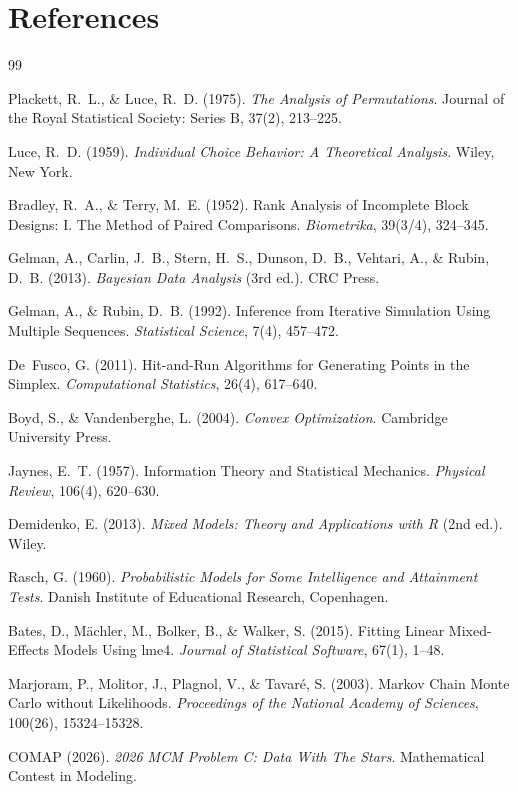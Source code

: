 \documentclass{article}
\begin{document}
\section*{References}
\begin{thebibliography}{99}

Plackett, R.~L., \& Luce, R.~D. (1975).
\emph{The Analysis of Permutations}.
Journal of the Royal Statistical Society: Series B, 37(2), 213--225.

Luce, R.~D. (1959).
\emph{Individual Choice Behavior: A Theoretical Analysis}.
Wiley, New York.

Bradley, R.~A., \& Terry, M.~E. (1952).
Rank Analysis of Incomplete Block Designs: I. The Method of Paired Comparisons.
\emph{Biometrika}, 39(3/4), 324--345.

Gelman, A., Carlin, J.~B., Stern, H.~S., Dunson, D.~B., Vehtari, A., \& Rubin, D.~B. (2013).
\emph{Bayesian Data Analysis} (3rd ed.).
CRC Press.

Gelman, A., \& Rubin, D.~B. (1992).
Inference from Iterative Simulation Using Multiple Sequences.
\emph{Statistical Science}, 7(4), 457--472.

De~Fusco, G. (2011).
Hit-and-Run Algorithms for Generating Points in the Simplex.
\emph{Computational Statistics}, 26(4), 617--640.

Boyd, S., \& Vandenberghe, L. (2004).
\emph{Convex Optimization}.
Cambridge University Press.

Jaynes, E.~T. (1957).
Information Theory and Statistical Mechanics.
\emph{Physical Review}, 106(4), 620--630.

Demidenko, E. (2013).
\emph{Mixed Models: Theory and Applications with R} (2nd ed.).
Wiley.

Rasch, G. (1960).
\emph{Probabilistic Models for Some Intelligence and Attainment Tests}.
Danish Institute of Educational Research, Copenhagen.

Bates, D., M\"achler, M., Bolker, B., \& Walker, S. (2015).
Fitting Linear Mixed-Effects Models Using lme4.
\emph{Journal of Statistical Software}, 67(1), 1--48.

Marjoram, P., Molitor, J., Plagnol, V., \& Tavar\'e, S. (2003).
Markov Chain Monte Carlo without Likelihoods.
\emph{Proceedings of the National Academy of Sciences}, 100(26), 15324--15328.

COMAP (2026).
\emph{2026 MCM Problem C: Data With The Stars}.
Mathematical Contest in Modeling.

\end{thebibliography}
\end{document}
